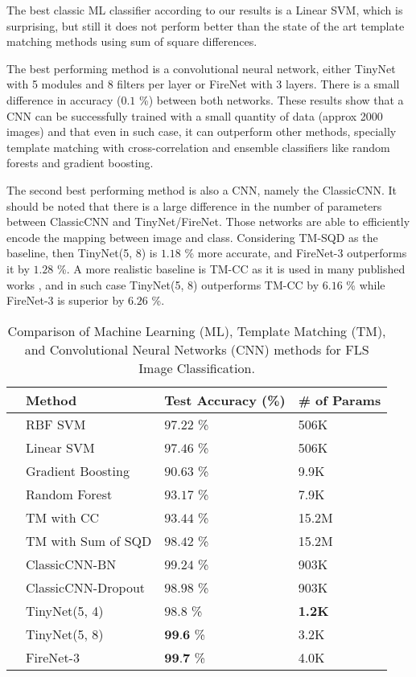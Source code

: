 The best classic ML classifier according to our results is a Linear SVM, which is surprising, but still it does not perform better than the state of the art template matching methods using sum of square differences.

The best performing method is a convolutional neural network, either TinyNet with 5 modules and 8 filters per layer or FireNet with 3 layers. There is a small difference in accuracy ($0.1$ \%) between both networks. These results show that a CNN can be successfully trained with a small quantity of data (approx 2000 images) and that even in such case, it can outperform other methods, specially template matching with cross-correlation and ensemble classifiers like random forests and gradient boosting.

The second best performing method is also a CNN, namely the ClassicCNN. It should be noted that there is a large difference in the number of parameters between ClassicCNN and TinyNet/FireNet. Those networks are able to efficiently encode the mapping between image and class. Considering TM-SQD as the baseline, then TinyNet(5, 8) is $1.18 $ \% more accurate, and FireNet-3 outperforms it by $1.28$ \%. A more realistic baseline is TM-CC as it is used in many published works \cite{hurtos2013automatic}, and in such case TinyNet(5, 8) outperforms TM-CC by $6.16$ \% while FireNet-3 is superior by $6.26$ \%.

\begin{table}[t]
	\begin{tabular}{llll}
		\hline 
		& Method 							& Test Accuracy (\%)	& \# of Params\\ 
		\hline 
		\multirow{4}{*}{\rotatebox{90}{ML}} & RBF SVM		& $97.22$ \% 			& 506K\\ 
		& Linear SVM	& $97.46$ \% 			& 506K\\ 
		& Gradient Boosting				& $90.63$ \% 			& 9.9K\\
		& Random Forest					& $93.17$ \%  			& 7.9K\\
		\hline
		\multirow{2}{*}{\rotatebox{90}{TM}} & TM with CC		& $93.44$ \% 			& 15.2M \\
		& TM with Sum of SQD	& $98.42$ \% 			& 15.2M \\
		\hline
		\multirow{5}{*}{\rotatebox{90}{CNN}} & ClassicCNN-BN					& $99.24$ \% 	& 903K\\
		& ClassicCNN-Dropout			& $98.98$ \% 			& 903K\\
		\cline{2-4}
		& TinyNet(5, 4)					& $98.8$ \%				& \textbf{1.2K}\\
		& TinyNet(5, 8)					& $\textbf{99.6}$ \%	& 3.2K\\
		\cline{2-4}
		& FireNet-3						& $\textbf{99.7}$ \%	& 4.0K\\
		\hline 
	\end{tabular} 
	\caption{Comparison of Machine Learning (ML), Template Matching (TM), and Convolutional Neural Networks (CNN) methods for FLS Image Classification.}
	\label{sic:comparisonMLDLTM}
\end{table}

